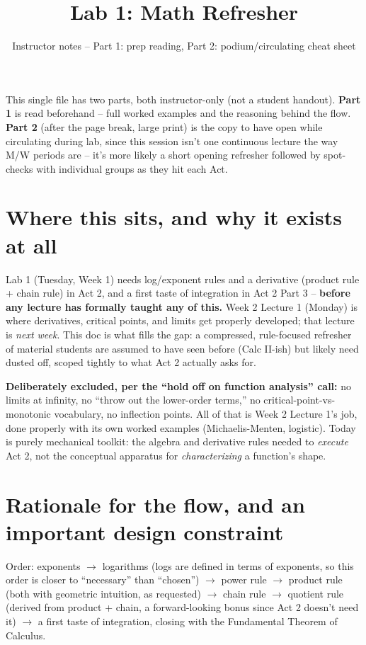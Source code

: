 \documentclass[12pt,]{article}
\title{Lab 1: Math Refresher}
\subtitle{Instructor notes -- Part 1: prep reading, Part 2: podium/circulating
cheat sheet}
\author{}
\date{\vspace{-2.5em}}
\begin{document}
\maketitle

This single file has two parts, both instructor-only (not a student
handout). \textbf{Part 1} is read beforehand -- full worked examples and
the reasoning behind the flow. \textbf{Part 2} (after the page break,
large print) is the copy to have open while circulating during lab,
since this session isn't one continuous lecture the way M/W periods are
-- it's more likely a short opening refresher followed by spot-checks
with individual groups as they hit each Act.

\section{Where this sits, and why it exists at
all}\label{where-this-sits-and-why-it-exists-at-all}

Lab 1 (Tuesday, Week 1) needs log/exponent rules and a derivative
(product rule + chain rule) in Act 2, and a first taste of integration
in Act 2 Part 3 -- \textbf{before any lecture has formally taught any of
this.} Week 2 Lecture 1 (Monday) is where derivatives, critical points,
and limits get properly developed; that lecture is \emph{next week}.
This doc is what fills the gap: a compressed, rule-focused refresher of
material students are assumed to have seen before (Calc II-ish) but
likely need dusted off, scoped tightly to what Act 2 actually asks for.

\textbf{Deliberately excluded, per the ``hold off on function analysis''
call:} no limits at infinity, no ``throw out the lower-order terms,'' no
critical-point-vs-monotonic vocabulary, no inflection points. All of
that is Week 2 Lecture 1's job, done properly with its own worked
examples (Michaelis-Menten, logistic). Today is purely mechanical
toolkit: the algebra and derivative rules needed to \emph{execute} Act
2, not the conceptual apparatus for \emph{characterizing} a function's
shape.

\section{Rationale for the flow, and an important design
constraint}\label{rationale-for-the-flow-and-an-important-design-constraint}

Order: exponents \(\to\) logarithms (logs are defined in terms of
exponents, so this order is closer to ``necessary'' than ``chosen'')
\(\to\) power rule \(\to\) product rule (both with geometric intuition,
as requested) \(\to\) chain rule \(\to\) quotient rule (derived from
product + chain, a forward-looking bonus since Act 2 doesn't need it)
\(\to\) a first taste of integration, closing with the Fundamental
Theorem of Calculus.
\end{document}

